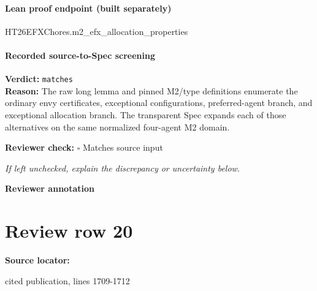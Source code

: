 \documentclass[10pt]{article}
\newcommand{\reviewerbox}{%
  \par\noindent\fbox{\parbox{0.96\linewidth}{\rule{0pt}{0.38in}}}\par
}
\newcommand{\reviewmatch}[1]{%
  \par\noindent\textbf{Reviewer check:} $\square$\; #1\par
  \noindent\emph{If left unchecked, explain the discrepancy or uncertainty below.}\par
}
\begin{document}
\paragraph{Lean proof endpoint (built separately)}\begin{ReviewVerbatim}
HT26EFXChores.m2_efx_allocation_properties
\end{ReviewVerbatim}

\paragraph{Recorded source-to-Spec screening}
\textbf{Verdict:} \texttt{matches}
\\
\textbf{Reason:} The raw long lemma and pinned M2/type definitions enumerate the ordinary envy certificates, exceptional configurations, preferred-agent branch, and exceptional allocation branch. The transparent Spec expands each of those alternatives on the same normalized four-agent M2 domain.
\reviewmatch{Matches source input}
\noindent\textbf{Reviewer annotation}\par
\reviewerbox
\clearpage
\hypertarget{source-claim-c475426ec81f3892}{}
\section*{Review row 20}
\textbf{Source locator:} {\footnotesize\raggedright cited publication, lines 1709-\allowbreak{}1712\par}
\end{document}
